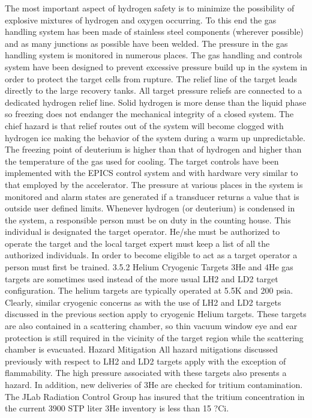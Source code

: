 {{{	The most important aspect of hydrogen safety is to minimize the possibility of explosive mixtures of hydrogen and oxygen occurring. To this end the gas handling system has been made of stainless steel components (wherever possible) and as many junctions as possible have been welded. The pressure in the gas handling system is monitored in numerous places. The gas handling and controls system have been designed to prevent excessive pressure build up in the system in order to protect the target cells from rupture. The relief line of the target leads directly to the large recovery tanks. All target pressure reliefs are connected to a dedicated hydrogen relief line. 
	Solid hydrogen is more dense than the liquid phase so freezing does not endanger the mechanical integrity of a closed system. The chief hazard is that relief routes out of the system will become clogged with hydrogen ice making the behavior of the system during a warm up unpredictable. The freezing point of deuterium is higher than that of hydrogen and higher than the temperature of the gas used for cooling. 
	The target controls have been implemented with the EPICS control system and with hardware very similar to that employed by the accelerator. The pressure at various places in the system is monitored and alarm states are generated if a transducer returns a value that is outside user defined limits. 
	Whenever hydrogen (or deuterium) is condensed in the system, a responsible person must be on duty in the counting house. This individual is designated the target operator. He/she must be authorized to operate the target and the local target expert must keep a list of all the authorized individuals. In order to become eligible to act as a target operator a person must first be trained. 
3.5.2	Helium Cryogenic Targets
	3He and 4He gas targets are sometimes used instead of the more usual LH2 and LD2 target configuration. The helium targets are typically operated at 5.5K and 200 psia. Clearly, similar cryogenic concerns as with the use of LH2 and LD2 targets discussed in the previous section apply to cryogenic Helium targets. These targets are also contained in a scattering chamber, so thin vacuum window eye and ear protection is still required in the vicinity of the target region while the scattering chamber is evacuated. 
Hazard Mitigation
	All hazard mitigations discussed previously with respect to LH2 and LD2 targets apply with the exception of flammability. The high pressure associated with these targets also presents a hazard. In addition, new deliveries of 3He are checked for tritium contamination. The JLab Radiation Control Group has insured that the tritium concentration in the current 3900 STP liter 3He inventory is less than 15 ?Ci.
}}}
